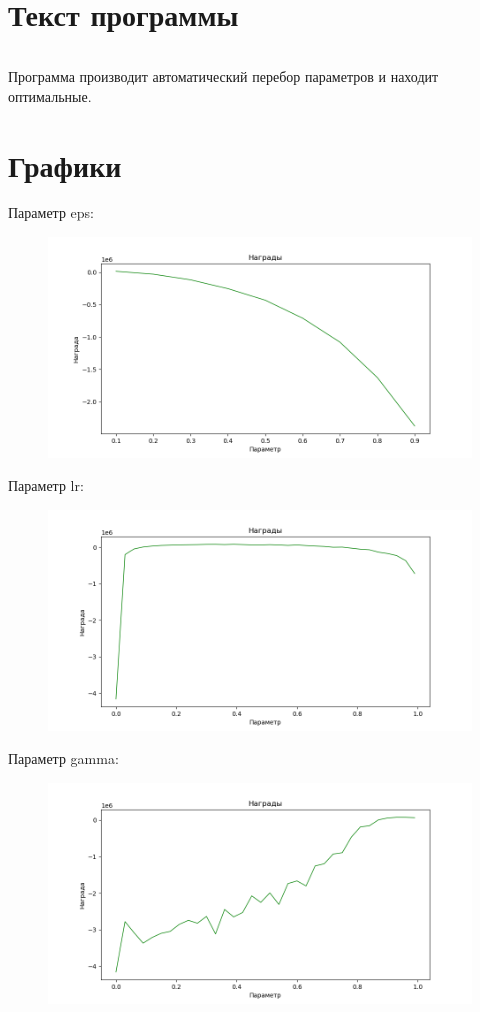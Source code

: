 \documentclass[a4paper]{article}
\begin{document}
  \section{Текст программы}
  \inputminted{python}{rk2.py}
  Программа производит автоматический перебор параметров и находит оптимальные.
  \pagebreak

  \section{Графики}
  Параметр eps:
  \begin{figure}[H]
    \includegraphics[scale=0.5]{rk21}
  \end{figure}
  Параметр lr:
  \begin{figure}[H]
    \includegraphics[scale=0.5]{rk22}
  \end{figure}
  \pagebreak
  Параметр gamma:
  \begin{figure}[H]
    \includegraphics[scale=0.5]{rk23}
  \end{figure}
\end{document}

